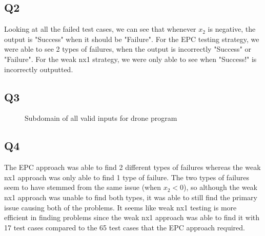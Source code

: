 \documentclass[12pt, letterpaper, titlepage]{article}
\begin{document}
\subsection{Q2}
Looking at all the failed test cases, we can see that whenever $x_2$ is negative, the output is "Success" when it should be "Failure". For the EPC testing strategy, we were able to see 2 types of failures, when the output is incorrectly "Success" or "Failure". For the weak nx1 strategy, we were only able to see when "Success!" is incorrectly outputted.

\subsection{Q3}

\begin{figure}[H]
  \centering
  \caption{Subdomain of all valid inputs for drone program}
  \end{figure}
  \subsection{Q4}
  The EPC approach was able to find 2 different types of failures whereas the weak nx1 approach was only able to find 1 type of failure. The two types of failures seem to have stemmed from the same issue (when $x_2 < 0$), so although the weak nx1 approach was unable to find both types, it was able to still find the primary issue causing both of the problems. It seems like weak nx1 testing is more efficient in finding problems since the weak nx1 approach was able to find it with 17 test cases compared to the 65 test cases that the EPC approach required.
\end{document}
